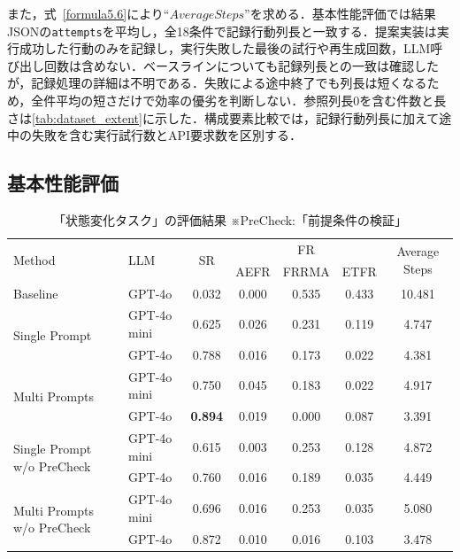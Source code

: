 また，式~\ref{formula5.6}により``$AverageSteps$''を求める．基本性能評価では結果JSONの\texttt{attempts}を平均し，全18条件で記録行動列長と一致する．提案実装は実行成功した行動のみを記録し，実行失敗した最後の試行や再生成回数，LLM呼び出し回数は含めない．ベースラインについても記録列長との一致は確認したが，記録処理の詳細は不明である．失敗による途中終了でも列長は短くなるため，全件平均の短さだけで効率の優劣を判断しない．参照列長0を含む件数と長さは\ref{tab:dataset_extent}に示した．構成要素比較では，記録行動列長に加えて途中の失敗を含む実行試行数とAPI要求数を区別する．


\subsection{基本性能評価}\label{sec5.4}
\begin{table}[tb]
    \caption{「状態変化タスク」の評価結果  ※PreCheck:「前提条件の検証」}
    \label{result1}
    \centering
    \begin{tabular}{llccccc}
    \hline
         \multirow{2}{*}{Method} & \multirow{2}{*}{LLM} & \multirow{2}{*}{SR} & \multicolumn{3}{c}{FR} & \multirow{2}{*}{Average Steps}\\
          & & & AEFR & FRRMA & ETFR\\
    \hline
         Baseline~\cite{huang22} & GPT-4o & 0.032 & 0.000 & 0.535 & 0.433 & 10.481\\
    \hline    
         \multirow{2}{*}{Single Prompt} & GPT-4o mini & 0.625 & 0.026 & 0.231 & 0.119 & 4.747\\
         & GPT-4o & 0.788 & 0.016 & 0.173 & 0.022 & 4.381\\
         
         \multirow{2}{*}{Multi Prompts} & GPT-4o mini & 0.750 & 0.045 & 0.183 & 0.022 & 4.917\\
         & GPT-4o & \textbf{0.894} & 0.019 & 0.000 & 0.087 & 3.391\\
    \hline
        \multirow{2}{*}{Single Prompt w/o PreCheck} & GPT-4o mini & 0.615 & 0.003 & 0.253 & 0.128 & 4.872\\
         & GPT-4o & 0.760 & 0.016 & 0.189 & 0.035 & 4.449\\
         
         \multirow{2}{*}{Multi Prompts w/o PreCheck} & GPT-4o mini & 0.696 & 0.016 & 0.253 & 0.035 & 5.080\\
         & GPT-4o & 0.872 & 0.010 & 0.016 & 0.103 & 3.478\\
    \hline
    \end{tabular}
\end{table}

